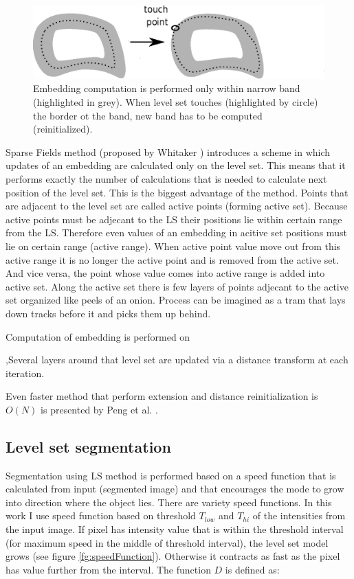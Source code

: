 \begin{figure}
    \centering
    \includegraphics[width=14cm]{data/narrowBands.eps}
    \caption[Narrow bands computation illustration]{Embedding computation is performed only within narrow band (highlighted in grey). When level set touches (highlighted by circle) the border ot the band, new band has to be computed (reinitialized).}
    \label{fg:narrowBands}
\end{figure}

Sparse Fields method (proposed by Whitaker \cite{sparseFilelds}) introduces a scheme in which updates of an embedding are calculated only on the level set. This means that it performs exactly the number of calculations that is needed to calculate next position of the level set. This is the biggest advantage of the method. Points that are adjacent to the level set are called active points (forming active set). Because active points must be adjecant to the LS their positions lie within certain range from the LS. Therefore even values of an embedding in acitive set positions must lie on certain range (active range). When active point value move out from this active range it is no longer the active point and is removed from the active set. And vice versa, the point whose value comes into active range is added into active set. Along the active set there is few layers of points adjecant to the active set organized like peels of an onion. 
Process can be imagined as a tram that lays down tracks before it and picks them up behind.

 Computation of embedding is performed on 

,Several layers around that level set are updated via a distance transform at each iteration.

Even faster method that perform extension and distance reinitialization is $O(N)$ is presented by Peng et al. \cite{pengSparseFields}.

\subsection{Level set segmentation}

Segmentation using LS method is performed based on a speed function that is calculated from input (segmented image) and that encourages the mode to grow into direction where the object lies. There are variety speed functions. In this work I use speed function based on threshold $T_{low}$ and $T_{hi}$ of the intensities from the input image. If pixel has intensity value that is within the threshold interval (for maximum speed in the middle of threshold interval), the level set model grows (see figure \ref{fg:speedFunction}). Otherwise it contracts as fast as the pixel has value further from the interval. The function $D$ is defined as:

